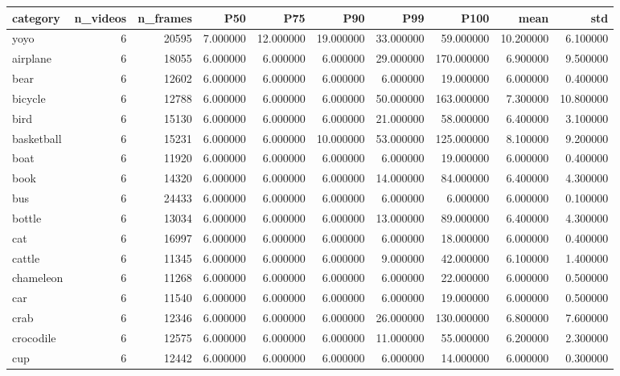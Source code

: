 \begin{tabular}{lrrrrrrrrr}
\toprule
category & n_videos & n_frames & P50 & P75 & P90 & P99 & P100 & mean & std \\
\midrule
yoyo & 6 & 20595 & 7.000000 & 12.000000 & 19.000000 & 33.000000 & 59.000000 & 10.200000 & 6.100000 \\
airplane & 6 & 18055 & 6.000000 & 6.000000 & 6.000000 & 29.000000 & 170.000000 & 6.900000 & 9.500000 \\
bear & 6 & 12602 & 6.000000 & 6.000000 & 6.000000 & 6.000000 & 19.000000 & 6.000000 & 0.400000 \\
bicycle & 6 & 12788 & 6.000000 & 6.000000 & 6.000000 & 50.000000 & 163.000000 & 7.300000 & 10.800000 \\
bird & 6 & 15130 & 6.000000 & 6.000000 & 6.000000 & 21.000000 & 58.000000 & 6.400000 & 3.100000 \\
basketball & 6 & 15231 & 6.000000 & 6.000000 & 10.000000 & 53.000000 & 125.000000 & 8.100000 & 9.200000 \\
boat & 6 & 11920 & 6.000000 & 6.000000 & 6.000000 & 6.000000 & 19.000000 & 6.000000 & 0.400000 \\
book & 6 & 14320 & 6.000000 & 6.000000 & 6.000000 & 14.000000 & 84.000000 & 6.400000 & 4.300000 \\
bus & 6 & 24433 & 6.000000 & 6.000000 & 6.000000 & 6.000000 & 6.000000 & 6.000000 & 0.100000 \\
bottle & 6 & 13034 & 6.000000 & 6.000000 & 6.000000 & 13.000000 & 89.000000 & 6.400000 & 4.300000 \\
cat & 6 & 16997 & 6.000000 & 6.000000 & 6.000000 & 6.000000 & 18.000000 & 6.000000 & 0.400000 \\
cattle & 6 & 11345 & 6.000000 & 6.000000 & 6.000000 & 9.000000 & 42.000000 & 6.100000 & 1.400000 \\
chameleon & 6 & 11268 & 6.000000 & 6.000000 & 6.000000 & 6.000000 & 22.000000 & 6.000000 & 0.500000 \\
car & 6 & 11540 & 6.000000 & 6.000000 & 6.000000 & 6.000000 & 19.000000 & 6.000000 & 0.500000 \\
crab & 6 & 12346 & 6.000000 & 6.000000 & 6.000000 & 26.000000 & 130.000000 & 6.800000 & 7.600000 \\
crocodile & 6 & 12575 & 6.000000 & 6.000000 & 6.000000 & 11.000000 & 55.000000 & 6.200000 & 2.300000 \\
cup & 6 & 12442 & 6.000000 & 6.000000 & 6.000000 & 6.000000 & 14.000000 & 6.000000 & 0.300000 \\

\end{tabular}
